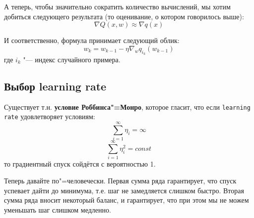 А теперь, чтобы значительно сократить количество вычислений, мы хотим
добиться следующего результата (то оценивание, о котором говорилось выше):
$$
\nabla Q(x, w) \approx \nabla q(x)
$$

И соответственно, формула принимает следующий облик:
\[
w_{k} = w_{k-1} - \eta \nabla_w q_{i_k}(w_{k-1})
\]
где $i_k$ "--- индекс случайного примера. 

\subsection*{Выбор learning rate}

Существует т.н. \textbf{условие Роббинса"=Монро}, которое гласит, что если \texttt{learning rate} удовлетворяет условиям:
\[
\sum_{i=1}^\infty \eta_i = \infty
\]
\[
\sum_{i=1}^\infty \eta_i^2 = const
\]
то градиентный спуск сойдётся с вероятностью 1.

Теперь давайте по"=человечески. Первая сумма ряда гарантирует, что спуск успевает дайти до минимума, т.е. шаг не замедляется слишком быстро. Вторая сумма ряда вносит некоторый баланс, и гарантирует, что при этом мы не можем уменьшать шаг слишком медленно.

\newpage
